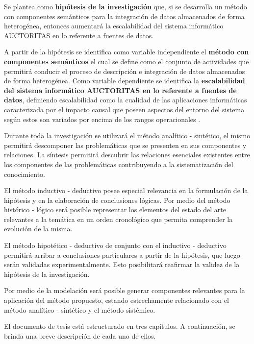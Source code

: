 Se plantea como \textbf{hipótesis de la investigación} que, si se desarrolla un método con componentes semánticos para la integración de datos almacenados de forma heterogénea, entonces aumentará la escalabilidad del sistema informático AUCTORITAS en lo referente a fuentes de datos.

A partir de la hipótesis se identifica como variable independiente el \textbf{método con componentes semánticos} el cual se define como el conjunto de actividades \citep{Offermann2010} que permitirá conducir el proceso de descripción e integración de datos almacenados de forma heterogénea. Como variable dependiente se identifica la \textbf{escalabilidad del sistema informático AUCTORITAS en lo referente a fuentes de datos}, definiendo escalabilidad como la cualidad de las aplicaciones informáticas caracterizada por el impacto causal que poseen aspectos del entorno del sistema según estos son variados por encima de los rangos operacionales \citep{duboc2006framework}.

Durante toda la investigación se utilizará el método analítico - sintético, el mismo permitirá descomponer las problemáticas que se presenten en sus componentes y relaciones. La síntesis permitirá descubrir las relaciones esenciales existentes entre los componentes de las problemáticas contribuyendo a la sistematización del conocimiento. 

El método inductivo - deductivo posee especial relevancia en la formulación de la hipótesis y en la elaboración de conclusiones lógicas. Por medio del método histórico - lógico será posible representar los elementos del estado del arte relevantes a la temática en un orden cronológico que permita comprender la evolución de la misma.

El método hipotético - deductivo de conjunto con el inductivo - deductivo permitirá arribar a conclusiones particulares a partir de la hipótesis, que luego serán validadas experimentalmente. Esto posibilitará reafirmar la validez de la hipótesis de la investigación.

Por medio de la modelación será posible generar componentes relevantes para la aplicación del método propuesto, estando estrechamente relacionado con el método analítico - sintético y el método sistémico.

El documento de tesis está estructurado en tres capítulos. A continuación, se brinda una breve descripción de cada uno de ellos.
